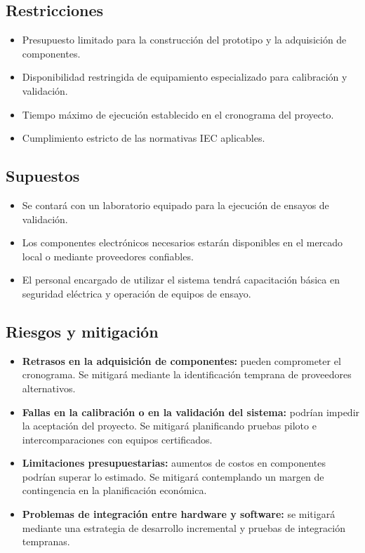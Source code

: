 \documentclass[a4paper,12pt]{article}
\begin{document}
\subsection{Restricciones}
\begin{itemize}
    \item Presupuesto limitado para la construcción del prototipo y la adquisición de componentes.
    \item Disponibilidad restringida de equipamiento especializado para calibración y validación.
    \item Tiempo máximo de ejecución establecido en el cronograma del proyecto.
    \item Cumplimiento estricto de las normativas IEC aplicables.
\end{itemize}

\subsection{Supuestos}
\begin{itemize}
    \item Se contará con un laboratorio equipado para la ejecución de ensayos de validación.
    \item Los componentes electrónicos necesarios estarán disponibles en el mercado local o mediante proveedores confiables.
    \item El personal encargado de utilizar el sistema tendrá capacitación básica en seguridad eléctrica y operación de equipos de ensayo.
\end{itemize}

\subsection{Riesgos y mitigación}
\begin{itemize}
    \item \textbf{Retrasos en la adquisición de componentes:} pueden comprometer el cronograma. Se mitigará mediante la identificación temprana de proveedores alternativos.
    \item \textbf{Fallas en la calibración o en la validación del sistema:} podrían impedir la aceptación del proyecto. Se mitigará planificando pruebas piloto e intercomparaciones con equipos certificados.
    \item \textbf{Limitaciones presupuestarias:} aumentos de costos en componentes podrían superar lo estimado. Se mitigará contemplando un margen de contingencia en la planificación económica.
    \item \textbf{Problemas de integración entre hardware y software:} se mitigará mediante una estrategia de desarrollo incremental y pruebas de integración tempranas.
\end{itemize}
\end{document}
